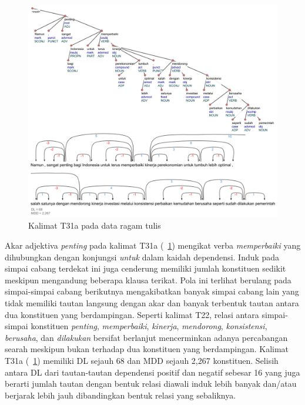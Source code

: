 \begin{figure}
	\centering \includegraphics[width=1
	\textwidth] {pics/ts2079.jpg} 
	\caption{Kalimat T31a pada data ragam tulis} 
	\label{fig:ts2079} 
\end{figure}

Akar adjektiva \textit{penting} pada kalimat T31a (\pic~\ref{fig:ts2079}) mengikat verba \textit{memperbaiki} yang dihubungkan dengan konjungsi \textit{untuk} dalam kaidah dependensi. Induk pada simpai cabang terdekat ini juga cenderung memiliki jumlah konstituen sedikit meskipun mengandung beberapa klausa terikat. Pola ini terlihat berulang pada simpai-simpai cabang berikutnya mengakibatkan banyak simpai cabang lain yang tidak memiliki tautan langsung dengan akar dan banyak terbentuk tautan antara dua konstituen yang berdampingan. Seperti kalimat T22, relasi antara simpai-simpai konstituen \textit{penting}, \textit{memperbaiki}, \textit{kinerja}, \textit{mendorong}, \textit{konsistensi}, \textit{berusaha}, dan \textit{dilakukan} bersifat berlanjut mencerminkan adanya percabangan searah meskipun bukan terhadap dua konstituen yang berdampingan. Kalimat T31a (\pic~\ref{fig:ts2079}) memiliki DL sejauh 68 dan MDD sejauh 2,267 konstituen. Selisih antara DL dari tautan-tautan dependensi positif dan negatif sebesar 16 yang juga berarti jumlah tautan dengan bentuk relasi diawali induk lebih banyak dan/atau berjarak lebih jauh dibandingkan bentuk relasi yang sebaliknya.

